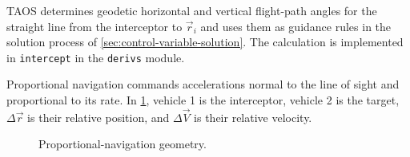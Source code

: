 TAOS determines geodetic horizontal and vertical flight-path angles for the straight
line from the interceptor to $\vec r_i$ and uses them as guidance rules in the
solution process of \cref{sec:control-variable-solution}. The calculation is
implemented in \texttt{intercept} in the \texttt{derivs} module.


Proportional navigation commands accelerations normal to the line of sight and
proportional to its rate. In \cref{fig:proportional-navigation-geometry}, vehicle 1
is the interceptor, vehicle 2 is the target, $\Delta\vec r$ is their relative position,
and $\Delta\vec V$ is their relative velocity.

\begin{figure}[htbp]
  \centering
  
  \caption{Proportional-navigation geometry.}
  \label{fig:proportional-navigation-geometry}
\end{figure}

